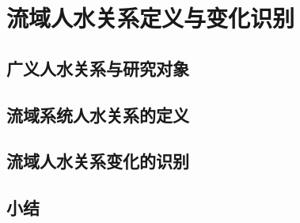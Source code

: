\chapter{流域人水关系定义与变化识别}\label{ch2:preface}


\section{广义人水关系与研究对象}\label{ch2:scope}


\section{流域系统人水关系的定义}\label{ch2:definitions}


\section{流域人水关系变化的识别}\label{ch2:dynamic}


\section{小结}\label{ch2:summary}

